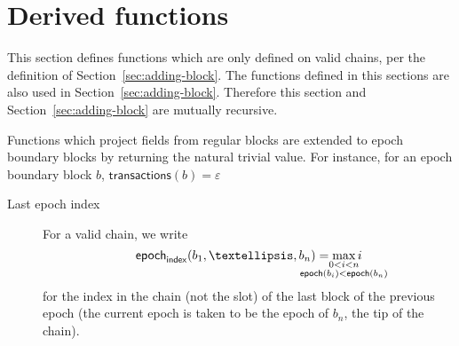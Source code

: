 \documentclass{article}
\newcommand{\emptylist}{ε}
\newcommand{\transactions}[1]{\mathsf{transactions}(#1)}
\newcommand{\epoch}[1]{\mathsf{epoch}(#1)}
\newcommand{\epochindex}[1]{\mathsf{epoch}_\mathsf{index}(#1)}
\begin{document}
\section{Derived functions}
\label{sec:derived-functions}

This section defines functions which are only defined on valid chains,
per the definition of Section~\ref{sec:adding-block}. The functions
defined in this sections are also used in
Section~\ref{sec:adding-block}. Therefore this section and
Section~\ref{sec:adding-block} are mutually recursive.

Functions which project fields from regular blocks are extended to
epoch boundary blocks by returning the natural trivial value. For
instance, for an epoch boundary block $b$,
$\transactions{b}=\emptylist$

\begin{description}
\item[Last epoch index] For a valid chain, we write
  $$
  \epochindex{b_1,…,b_n} = \max_{\mathclap{\substack{
      0<i<n\\
      \epoch{b_i} < \epoch{b_n}
  }}} i
  $$
  for the index in the chain (not the slot) of the last block of the
  previous epoch (the current epoch is taken to be the epoch of $b_n$,
  the tip of the chain).


\end{description}
\end{document}
